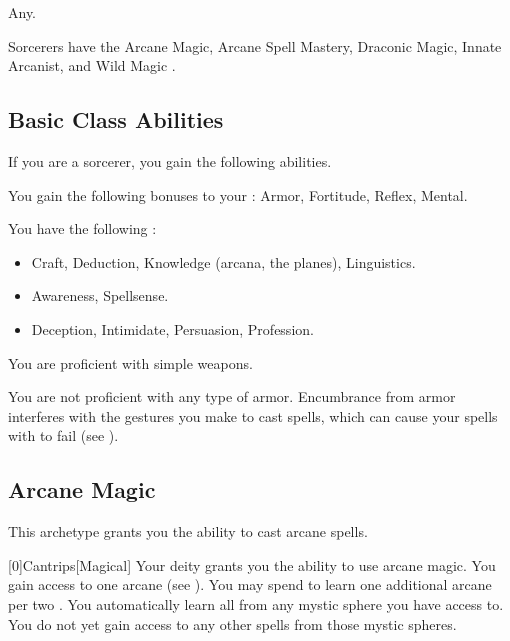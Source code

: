      Any.

     Sorcerers have the Arcane Magic, Arcane Spell Mastery, Draconic Magic, Innate Arcanist, and Wild Magic .

    \subsection{Basic Class Abilities}
        If you are a sorcerer, you gain the following abilities.

        You gain the following bonuses to your :  Armor,  Fortitude,  Reflex,  Mental.

        You have the following :
        \begin{itemize}
            \item {} Craft, Deduction, Knowledge (arcana, the planes), Linguistics.
            \item {} Awareness, Spellsense.
            \item {} Deception, Intimidate, Persuasion, Profession.
        \end{itemize}

        You are proficient with simple weapons.

        You are not proficient with any type of armor.
        Encumbrance from armor interferes with the gestures you make to cast spells, which can cause your spells with  to fail (see ).

    \newpage
    \subsection{Arcane Magic}
        This archetype grants you the ability to cast arcane spells.

        [0]{Cantrips}[Magical]
        Your deity grants you the ability to use arcane magic.
        You gain access to one arcane  (see ).
        You may spend  to learn one additional arcane  per two .
        You automatically learn all  from any mystic sphere you have access to.
        You do not yet gain access to any other spells from those mystic spheres.

